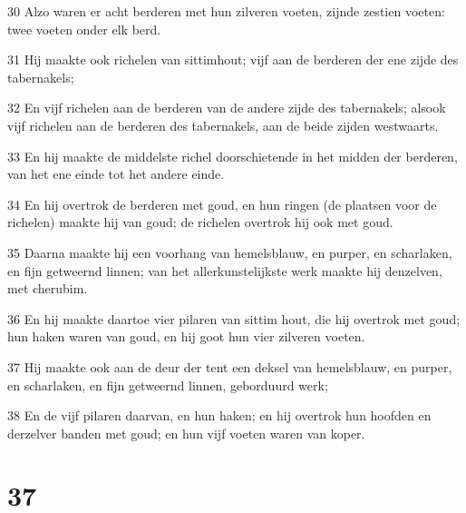 \par 30 Alzo waren er acht berderen met hun zilveren voeten, zijnde zestien voeten: twee voeten onder elk berd.
\par 31 Hij maakte ook richelen van sittimhout; vijf aan de berderen der ene zijde des tabernakels;
\par 32 En vijf richelen aan de berderen van de andere zijde des tabernakels; alsook vijf richelen aan de berderen des tabernakels, aan de beide zijden westwaarts.
\par 33 En hij maakte de middelste richel doorschietende in het midden der berderen, van het ene einde tot het andere einde.
\par 34 En hij overtrok de berderen met goud, en hun ringen (de plaatsen voor de richelen) maakte hij van goud; de richelen overtrok hij ook met goud.
\par 35 Daarna maakte hij een voorhang van hemelsblauw, en purper, en scharlaken, en fijn getweernd linnen; van het allerkunstelijkste werk maakte hij denzelven, met cherubim.
\par 36 En hij maakte daartoe vier pilaren van sittim hout, die hij overtrok met goud; hun haken waren van goud, en hij goot hun vier zilveren voeten.
\par 37 Hij maakte ook aan de deur der tent een deksel van hemelsblauw, en purper, en scharlaken, en fijn getweernd linnen, geborduurd werk;
\par 38 En de vijf pilaren daarvan, en hun haken; en hij overtrok hun hoofden en derzelver banden met goud; en hun vijf voeten waren van koper.

\chapter{37}

